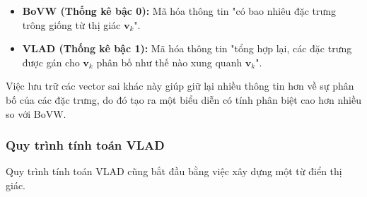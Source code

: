 \begin{itemize}
    \item \textbf{BoVW (Thống kê bậc 0):} Mã hóa thông tin "có bao nhiêu đặc trưng trông giống từ thị giác $\mathbf{v}_k$".
    \item \textbf{VLAD (Thống kê bậc 1):} Mã hóa thông tin "tổng hợp lại, các đặc trưng được gán cho $\mathbf{v}_k$ phân bố như thế nào xung quanh $\mathbf{v}_k$".
\end{itemize}
Việc lưu trữ các vector sai khác này giúp giữ lại nhiều thông tin hơn về sự phân bố của các đặc trưng, do đó tạo ra một biểu diễn có tính phân biệt cao hơn nhiều so với BoVW.

\subsubsection{Quy trình tính toán VLAD}
\label{subsubsec:vlad_pipeline}
Quy trình tính toán VLAD cũng bắt đầu bằng việc xây dựng một từ điển thị giác.
